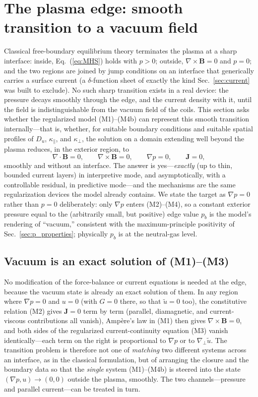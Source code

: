 \documentclass[english]{article}
\newcommand{\bB}{\mathbf{B}}
\newcommand{\bJ}{\mathbf{J}}
\newcommand{\gradperp}{\nabla_{\!\perp}}
\begin{document}
\section{The plasma edge: smooth transition to a vacuum field}
\label{sec:edge}

Classical free-boundary equilibrium theory terminates the plasma at a sharp interface: inside,
Eq.~(\ref{eq:MHS}) holds with $p>0$; outside, $\nabla\times\bB=0$ and $p=0$; and the two regions
are joined by jump conditions on an interface that generically carries a surface current (a
$\delta$-function sheet of exactly the kind Sec.~\ref{sec:current} was built to exclude). No such
sharp transition exists in a real device: the pressure decays smoothly through the edge, and the
current density with it, until the field is indistinguishable from the vacuum field of the coils.
This section asks whether the regularized model (M1)--(M4b) can represent this smooth transition
internally---that is, whether, for suitable boundary conditions and suitable spatial profiles of
$D_u$, $\kappa_\parallel$, and $\kappa_\perp$, the solution on a domain extending well beyond the
plasma reduces, in the exterior region, to
\begin{equation}
\nabla\cdot\bB=0,\qquad \nabla\times\bB=0,\qquad \nabla p=0,\qquad \bJ=0 ,
\label{eq:vacuum_target}
\end{equation}
smoothly and without an interface. The answer is yes---\emph{exactly} (up to thin, bounded current
layers) in interpretive mode, and asymptotically, with a controllable residual, in predictive
mode---and the mechanisms are the same regularization devices the model already contains. We state
the target as $\nabla p=0$ rather than $p=0$ deliberately: only $\nabla p$ enters
(M2)--(M4), so a constant exterior pressure equal to the (arbitrarily small, but positive) edge
value $p_b$ is the model's rendering of ``vacuum,'' consistent with the maximum-principle
positivity of Sec.~\ref{sec:p_properties}; physically $p_b$ is at the neutral-gas level.

\subsection{Vacuum is an exact solution of (M1)--(M3)}
\label{sec:vacuum_exact}

No modification of the force-balance or current equations is needed at the edge, because the
vacuum state is already an exact solution of them. In any region where $\nabla p=0$ and $u=0$
(with $G=0$ there, so that $\tilde u=0$ too),
the constitutive relation (M2) gives $\bJ=0$ term by term (parallel, diamagnetic, and
current-viscous contributions all vanish), Amp\`ere's law in (M1) then gives $\nabla\times\bB=0$,
and both sides of the regularized current-continuity equation (M3) vanish identically---each term
on the right is proportional to $\nabla p$ or to $\gradperp\tilde u$. The transition problem is
therefore not one of \emph{matching} two different systems across an interface, as in the
classical formulation, but of arranging the closure and the boundary data so that the
\emph{single} system (M1)--(M4b) is steered into the state $(\nabla p,u)\rightarrow(0,0)$ outside
the plasma, smoothly. The two channels---pressure and parallel current---can be treated in turn.
\end{document}
